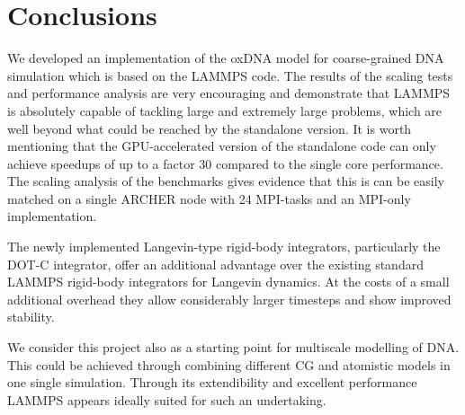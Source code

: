 \documentclass[12pt,onecolumn]{article}
\begin{document}

\section{Conclusions}

We developed an implementation of the oxDNA model for coarse-grained DNA simulation which is based on the LAMMPS code. 
The results of the scaling tests and performance analysis are very encouraging and demonstrate that LAMMPS is absolutely  
capable of tackling large and extremely large problems, which are well beyond what could be reached by the standalone version. 
It is worth mentioning that the GPU-accelerated version of the standalone code can only achieve speedups of up to a 
factor 30 compared to the single core performance. The scaling analysis of the benchmarks gives evidence 
that this is can be easily matched on a single ARCHER node with 24 MPI-tasks and an MPI-only implementation.

The newly implemented Langevin-type rigid-body integrators, particularly the DOT-C integrator, offer an additional advantage
over the existing standard LAMMPS rigid-body integrators for Langevin dynamics. At the costs of a small additional overhead 
they allow considerably larger timesteps and show improved stability.

We consider this project also as a starting point for multiscale modelling of DNA. This could be achieved through combining 
different CG and atomistic models in one single simulation. Through its extendibility and 
excellent performance LAMMPS appears ideally suited for such an undertaking.


\end{document}
